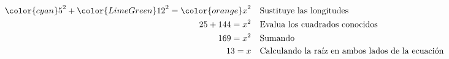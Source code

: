 \begin{solutionbox}{6.5cm}
\begin{align*}
        {\color{cyan}5}^2+{\color{LimeGreen}12}^2  ={\color{orange}x}^2 & \text{\quad Sustituye las longitudes}                         \\
        25+144  =x^2                                                    & \text{\quad Evalua los cuadrados conocidos}                   \\
        169=x^2                                                         & \text{\quad Sumando }                                         \\
        13=x                                                            & \text{\quad Calculando la raíz en ambos lados de la ecuación} \\
    \end{align*}
\end{solutionbox}
